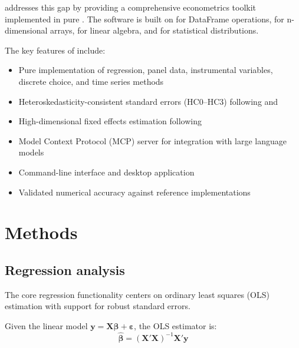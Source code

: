 \documentclass[article]{jss}
\begin{document}
 addresses this gap by providing a comprehensive econometrics
toolkit implemented in pure . The software is built on 
\citep{polars} for DataFrame operations,  \citep{ndarray} for
n-dimensional arrays,  \citep{faer} for linear algebra, and 
\citep{statrs} for statistical distributions.

The key features of  include:
\begin{itemize}
  \item Pure  implementation of regression, panel data, instrumental
    variables, discrete choice, and time series methods
  \item Heteroskedasticity-consistent standard errors (HC0--HC3) following
    \cite{White:1980} and \cite{MacKinnon+White:1985}
  \item High-dimensional fixed effects estimation following \cite{Gaure:2013}
  \item Model Context Protocol (MCP) server for integration with large language
    models \citep{MCP:2024}
  \item Command-line interface and desktop application
  \item Validated numerical accuracy against reference  implementations
\end{itemize}



\section{Methods} \label{sec:methods}


\subsection{Regression analysis} \label{sec:regression}

The core regression functionality centers on ordinary least squares (OLS)
estimation with support for robust standard errors.

Given the linear model $\mathbf{y} = \mathbf{X}\bm{\beta} + \bm{\varepsilon}$,
the OLS estimator is:
\begin{equation}
  \hat{\bm{\beta}} = (\mathbf{X}'\mathbf{X})^{-1}\mathbf{X}'\mathbf{y}
\end{equation}
\end{document}
